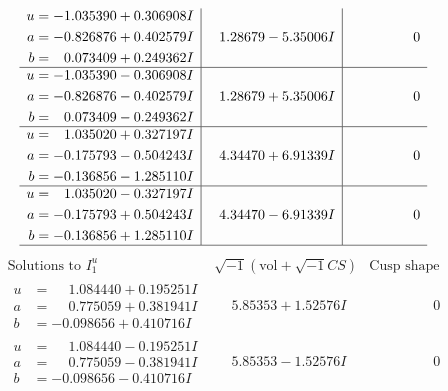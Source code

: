 \documentclass[1p]{elsarticle_modified}
\theoremstyle{definition}
\newcommand{\I}{\sqrt{-1}}
\begin{document}
$$\begin{array}{c|c|c}
\begin{aligned}
u &= -1.035390 + 0.306908 I \\
a &= -0.826876 + 0.402579 I \\
b &= \phantom{-}0.073409 + 0.249362 I\end{aligned}
 & \phantom{-}1.28679 - 5.35006 I & \phantom{-0.000000 } 0 \\ \hline\begin{aligned}
u &= -1.035390 - 0.306908 I \\
a &= -0.826876 - 0.402579 I \\
b &= \phantom{-}0.073409 - 0.249362 I\end{aligned}
 & \phantom{-}1.28679 + 5.35006 I & \phantom{-0.000000 } 0 \\ \hline\begin{aligned}
u &= \phantom{-}1.035020 + 0.327197 I \\
a &= -0.175793 - 0.504243 I \\
b &= -0.136856 - 1.285110 I\end{aligned}
 & \phantom{-}4.34470 + 6.91339 I & \phantom{-0.000000 } 0 \\ \hline\begin{aligned}
u &= \phantom{-}1.035020 - 0.327197 I \\
a &= -0.175793 + 0.504243 I \\
b &= -0.136856 + 1.285110 I\end{aligned}
 & \phantom{-}4.34470 - 6.91339 I & \phantom{-0.000000 } 0\\
 \hline 
 \end{array}$$\newpage$$\begin{array}{c|c|c}  
\text{Solutions to }I^u_{1}& \I (\text{vol} + \sqrt{-1}CS) & \text{Cusp shape}\\
 \hline 
\begin{aligned}
u &= \phantom{-}1.084440 + 0.195251 I \\
a &= \phantom{-}0.775059 + 0.381941 I \\
b &= -0.098656 + 0.410716 I\end{aligned}
 & \phantom{-}5.85353 + 1.52576 I & \phantom{-0.000000 } 0 \\ \hline\begin{aligned}
u &= \phantom{-}1.084440 - 0.195251 I \\
a &= \phantom{-}0.775059 - 0.381941 I \\
b &= -0.098656 - 0.410716 I\end{aligned}
 & \phantom{-}5.85353 - 1.52576 I & \phantom{-0.000000 } 0 \\ \hline\begin{aligned}

\end{aligned}
\end{array}$$
\end{document}
